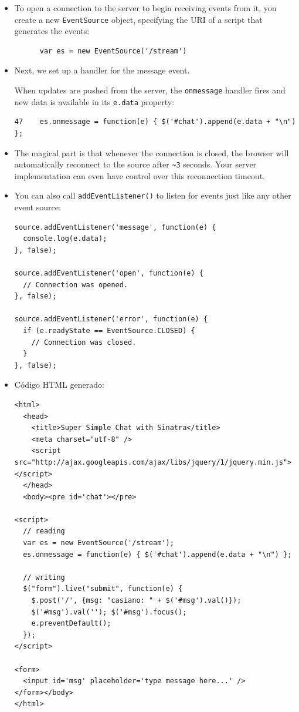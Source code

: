 \begin{itemize}
\item
To open a connection to the server to begin receiving events from
it, you create a new \verb|EventSource| object, specifying the URI of a
script that generates the events:
\begin{verbatim}
      var es = new EventSource('/stream')
\end{verbatim}


\item
Next, we set up a handler for the message event.

When updates are pushed from the server, the \verb|onmessage| handler fires
and new data is available in its \verb|e.data| property:

\begin{verbatim}
47    es.onmessage = function(e) { $('#chat').append(e.data + "\n") };
\end{verbatim}
\item
The magical
part is that whenever the connection is closed, the browser will
automatically reconnect to the source after \verb|~3| seconds. Your server
implementation can even have control over this reconnection timeout.

\item
You can
also call \verb|addEventListener()| to listen for events just like any
other event source:

\begin{verbatim}
source.addEventListener('message', function(e) {
  console.log(e.data);
}, false);

source.addEventListener('open', function(e) {
  // Connection was opened.
}, false);

source.addEventListener('error', function(e) {
  if (e.readyState == EventSource.CLOSED) {
    // Connection was closed.
  }
}, false);
\end{verbatim}

\item
Código HTML generado:
\begin{verbatim}
<html>
  <head> 
    <title>Super Simple Chat with Sinatra</title> 
    <meta charset="utf-8" />
    <script src="http://ajax.googleapis.com/ajax/libs/jquery/1/jquery.min.js"></script> 
  </head> 
  <body><pre id='chat'></pre>

<script>
  // reading
  var es = new EventSource('/stream');
  es.onmessage = function(e) { $('#chat').append(e.data + "\n") };

  // writing
  $("form").live("submit", function(e) {
    $.post('/', {msg: "casiano: " + $('#msg').val()});
    $('#msg').val(''); $('#msg').focus();
    e.preventDefault();
  });
</script>

<form>
  <input id='msg' placeholder='type message here...' />
</form></body>
</html>
\end{verbatim}
\end{itemize}

